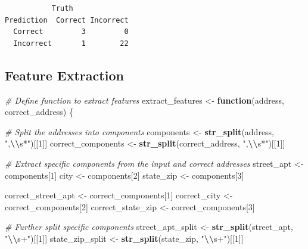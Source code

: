 \documentclass[
]{book}
\newenvironment{Shaded}{\begin{snugshade}}{\end{snugshade}}
\newcommand{\CommentTok}[1]{\textcolor[rgb]{0.56,0.35,0.01}{\textit{#1}}}
\newcommand{\ControlFlowTok}[1]{\textcolor[rgb]{0.13,0.29,0.53}{\textbf{#1}}}
\newcommand{\DecValTok}[1]{\textcolor[rgb]{0.00,0.00,0.81}{#1}}
\newcommand{\FunctionTok}[1]{\textcolor[rgb]{0.13,0.29,0.53}{\textbf{#1}}}
\newcommand{\NormalTok}[1]{#1}
\newcommand{\OtherTok}[1]{\textcolor[rgb]{0.56,0.35,0.01}{#1}}
\newcommand{\SpecialCharTok}[1]{\textcolor[rgb]{0.81,0.36,0.00}{\textbf{#1}}}
\newcommand{\StringTok}[1]{\textcolor[rgb]{0.31,0.60,0.02}{#1}}
\begin{document}
\begin{verbatim}
           Truth
Prediction  Correct Incorrect
  Correct         3         0
  Incorrect       1        22
\end{verbatim}

\hypertarget{feature-extraction}{%
\subsection{Feature Extraction}\label{feature-extraction}}

\begin{Shaded}
\begin{Highlighting}[]
\CommentTok{\# Define function to extract features}
\NormalTok{extract\_features }\OtherTok{\textless{}{-}} \ControlFlowTok{function}\NormalTok{(address, correct\_address) \{}
  
  \CommentTok{\# Split the addresses into components}
\NormalTok{  components }\OtherTok{\textless{}{-}} \FunctionTok{str\_split}\NormalTok{(address, }\StringTok{",}\SpecialCharTok{\textbackslash{}\textbackslash{}}\StringTok{s*"}\NormalTok{)[[}\DecValTok{1}\NormalTok{]]}
\NormalTok{  correct\_components }\OtherTok{\textless{}{-}} \FunctionTok{str\_split}\NormalTok{(correct\_address, }\StringTok{",}\SpecialCharTok{\textbackslash{}\textbackslash{}}\StringTok{s*"}\NormalTok{)[[}\DecValTok{1}\NormalTok{]]}
  
  \CommentTok{\# Extract specific components from the input and correct addresses}
\NormalTok{  street\_apt }\OtherTok{\textless{}{-}}\NormalTok{ components[}\DecValTok{1}\NormalTok{]}
\NormalTok{  city }\OtherTok{\textless{}{-}}\NormalTok{ components[}\DecValTok{2}\NormalTok{]}
\NormalTok{  state\_zip }\OtherTok{\textless{}{-}}\NormalTok{ components[}\DecValTok{3}\NormalTok{]}
  
\NormalTok{  correct\_street\_apt }\OtherTok{\textless{}{-}}\NormalTok{ correct\_components[}\DecValTok{1}\NormalTok{]}
\NormalTok{  correct\_city }\OtherTok{\textless{}{-}}\NormalTok{ correct\_components[}\DecValTok{2}\NormalTok{]}
\NormalTok{  correct\_state\_zip }\OtherTok{\textless{}{-}}\NormalTok{ correct\_components[}\DecValTok{3}\NormalTok{]}
  
  \CommentTok{\# Further split specific components}
\NormalTok{  street\_apt\_split }\OtherTok{\textless{}{-}} \FunctionTok{str\_split}\NormalTok{(street\_apt, }\StringTok{"}\SpecialCharTok{\textbackslash{}\textbackslash{}}\StringTok{s+"}\NormalTok{)[[}\DecValTok{1}\NormalTok{]]}
\NormalTok{  state\_zip\_split }\OtherTok{\textless{}{-}} \FunctionTok{str\_split}\NormalTok{(state\_zip, }\StringTok{"}\SpecialCharTok{\textbackslash{}\textbackslash{}}\StringTok{s+"}\NormalTok{)[[}\DecValTok{1}\NormalTok{]]}
  

\end{Highlighting}
\end{Shaded}
\end{document}
